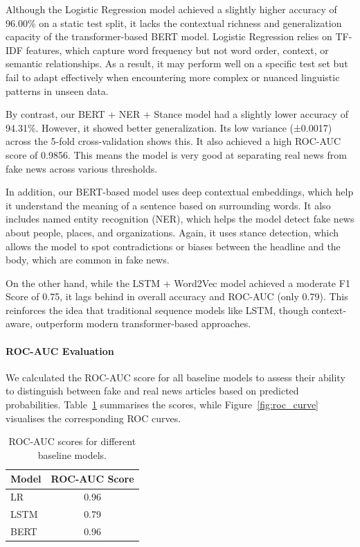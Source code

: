 \documentclass[11pt,a4paper]{article}
\begin{document}
Although the Logistic Regression model achieved a slightly higher accuracy of 96.00\% on a static test split, it lacks the contextual richness and generalization capacity of the transformer-based BERT model. Logistic Regression relies on TF-IDF features, which capture word frequency but not word order, context, or semantic relationships. As a result, it may perform well on a specific test set but fail to adapt effectively when encountering more complex or nuanced linguistic patterns in unseen data.

By contrast, our BERT + NER + Stance model had a slightly lower accuracy of 94.31\%. However, it showed better generalization. Its low variance (±0.0017) across the 5-fold cross-validation shows this. It also achieved a high ROC-AUC score of 0.9856. This means the model is very good at separating real news from fake news across various thresholds.

In addition, our BERT-based model uses deep contextual embeddings, which help it understand the meaning of a sentence based on surrounding words. It also includes named entity recognition (NER), which helps the model detect fake news about people, places, and organizations. Again, it uses stance detection, which allows the model to spot contradictions or biases between the headline and the body, which are common in fake news.

On the other hand, while the LSTM + Word2Vec model achieved a moderate F1 Score of 0.75, it lags behind in overall accuracy and ROC-AUC (only 0.79). This reinforces the idea that traditional sequence models like LSTM, though context-aware, outperform modern transformer-based approaches.

\paragraph{ROC-AUC Evaluation} We calculated the ROC-AUC score for all baseline models to assess their ability to distinguish between fake and real news articles based on predicted probabilities. Table~\ref{tab:roc_auc_score} summarises the scores, while Figure~\ref{fig:roc_curve} visualises the corresponding ROC curves.

\begin{table}[h]
    \centering
    \caption{ROC-AUC scores for different baseline models.}
    \label{tab:roc_auc_score}
    \small
    \begin{tabular}{lc}
        \toprule
        \textbf{Model} & \textbf{ROC-AUC Score} \\
        \midrule
        LR & 0.96 \\
        LSTM & 0.79 \\
        BERT & 0.96 \\
        \bottomrule
    \end{tabular}
\end{table}
\end{document}
